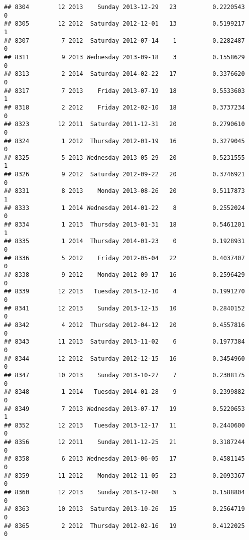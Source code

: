 \documentclass[
]{article}
\begin{document}
\begin{verbatim}
## 8304        12 2013    Sunday 2013-12-29   23          0.2220543             0
## 8305        12 2012  Saturday 2012-12-01   13          0.5199217             1
## 8307         7 2012  Saturday 2012-07-14    1          0.2282487             0
## 8311         9 2013 Wednesday 2013-09-18    3          0.1558629             0
## 8313         2 2014  Saturday 2014-02-22   17          0.3376620             0
## 8317         7 2013    Friday 2013-07-19   18          0.5533603             1
## 8318         2 2012    Friday 2012-02-10   18          0.3737234             0
## 8323        12 2011  Saturday 2011-12-31   20          0.2790610             0
## 8324         1 2012  Thursday 2012-01-19   16          0.3279045             0
## 8325         5 2013 Wednesday 2013-05-29   20          0.5231555             1
## 8326         9 2012  Saturday 2012-09-22   20          0.3746921             0
## 8331         8 2013    Monday 2013-08-26   20          0.5117873             1
## 8333         1 2014 Wednesday 2014-01-22    8          0.2552024             0
## 8334         1 2013  Thursday 2013-01-31   18          0.5461201             1
## 8335         1 2014  Thursday 2014-01-23    0          0.1928931             0
## 8336         5 2012    Friday 2012-05-04   22          0.4037407             0
## 8338         9 2012    Monday 2012-09-17   16          0.2596429             0
## 8339        12 2013   Tuesday 2013-12-10    4          0.1991270             0
## 8341        12 2013    Sunday 2013-12-15   10          0.2840152             0
## 8342         4 2012  Thursday 2012-04-12   20          0.4557816             0
## 8343        11 2013  Saturday 2013-11-02    6          0.1977384             0
## 8344        12 2012  Saturday 2012-12-15   16          0.3454960             0
## 8347        10 2013    Sunday 2013-10-27    7          0.2308175             0
## 8348         1 2014   Tuesday 2014-01-28    9          0.2399882             0
## 8349         7 2013 Wednesday 2013-07-17   19          0.5220653             1
## 8352        12 2013   Tuesday 2013-12-17   11          0.2440600             0
## 8356        12 2011    Sunday 2011-12-25   21          0.3187244             0
## 8358         6 2013 Wednesday 2013-06-05   17          0.4581145             0
## 8359        11 2012    Monday 2012-11-05   23          0.2093367             0
## 8360        12 2013    Sunday 2013-12-08    5          0.1588804             0
## 8363        10 2013  Saturday 2013-10-26   15          0.2564719             0
## 8365         2 2012  Thursday 2012-02-16   19          0.4122025             0

\end{verbatim}
\end{document}
